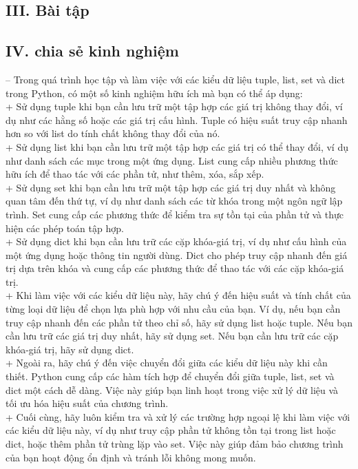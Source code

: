 \subsection*{III. Bài tập}
\subsection*{IV. chia sẻ kinh nghiệm}
-- Trong quá trình học tập và làm việc với các kiểu dữ liệu tuple, list, set và dict trong Python, có một số kinh nghiệm hữu ích mà bạn có thể áp dụng:\\
+ Sử dụng tuple khi bạn cần lưu trữ một tập hợp các giá trị không thay đổi, ví dụ như các hằng số hoặc các giá trị cấu hình. Tuple có hiệu suất truy cập nhanh hơn so với list do tính chất không thay đổi của nó.\\
+ Sử dụng list khi bạn cần lưu trữ một tập hợp các giá trị có thể thay đổi, ví dụ như danh sách các mục trong một ứng dụng. List cung cấp nhiều phương thức hữu ích để thao tác với các phần tử, như thêm, xóa, sắp xếp.\\
+ Sử dụng set khi bạn cần lưu trữ một tập hợp các giá trị duy nhất và không quan tâm đến thứ tự, ví dụ như danh sách các từ khóa trong một ngôn ngữ lập trình. Set cung cấp các phương thức để kiểm tra sự tồn tại của phần tử và thực hiện các phép toán tập hợp.\\
+ Sử dụng dict khi bạn cần lưu trữ các cặp khóa-giá trị, ví dụ như cấu hình của một ứng dụng hoặc thông tin người dùng. Dict cho phép truy cập nhanh đến giá trị dựa trên khóa và cung cấp các phương thức để thao tác với các cặp khóa-giá trị.\\
+ Khi làm việc với các kiểu dữ liệu này, hãy chú ý đến hiệu suất và tính chất của từng loại dữ liệu để chọn lựa phù hợp với nhu cầu của bạn. Ví dụ, nếu bạn cần truy cập nhanh đến các phần tử theo chỉ số, hãy sử dụng list hoặc tuple. Nếu bạn cần lưu trữ các giá trị duy nhất, hãy sử dụng set. Nếu bạn cần lưu trữ các cặp khóa-giá trị, hãy sử dụng dict.\\
+ Ngoài ra, hãy chú ý đến việc chuyển đổi giữa các kiểu dữ liệu này khi cần thiết. Python cung cấp các hàm tích hợp để chuyển đổi giữa tuple, list, set và dict một cách dễ dàng. Việc này giúp bạn linh hoạt trong việc xử lý dữ liệu và tối ưu hóa hiệu suất của chương trình.\\
+ Cuối cùng, hãy luôn kiểm tra và xử lý các trường hợp ngoại lệ khi làm việc với các kiểu dữ liệu này, ví dụ như truy cập phần tử không tồn tại trong list hoặc dict, hoặc thêm phần tử trùng lặp vào set. Việc này giúp đảm bảo chương trình của bạn hoạt động ổn định và tránh lỗi không mong muốn.

